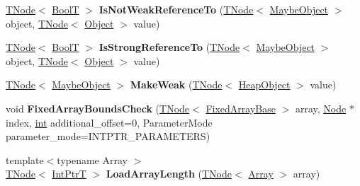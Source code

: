 \begin{DoxyCompactItemize}
\mbox{\hyperlink{classv8_1_1internal_1_1compiler_1_1TNode}{T\+Node}}$<$ \mbox{\hyperlink{structv8_1_1internal_1_1BoolT}{BoolT}} $>$ {\bfseries Is\+Not\+Weak\+Reference\+To} (\mbox{\hyperlink{classv8_1_1internal_1_1compiler_1_1TNode}{T\+Node}}$<$ \mbox{\hyperlink{classv8_1_1internal_1_1MaybeObject}{Maybe\+Object}} $>$ object, \mbox{\hyperlink{classv8_1_1internal_1_1compiler_1_1TNode}{T\+Node}}$<$ \mbox{\hyperlink{classv8_1_1internal_1_1Object}{Object}} $>$ value)
\item 
\mbox{\label{classv8_1_1internal_1_1CodeStubAssembler_a02ca556ddbd3b71af81a1e4bc521a5c2}} 
\mbox{\hyperlink{classv8_1_1internal_1_1compiler_1_1TNode}{T\+Node}}$<$ \mbox{\hyperlink{structv8_1_1internal_1_1BoolT}{BoolT}} $>$ {\bfseries Is\+Strong\+Reference\+To} (\mbox{\hyperlink{classv8_1_1internal_1_1compiler_1_1TNode}{T\+Node}}$<$ \mbox{\hyperlink{classv8_1_1internal_1_1MaybeObject}{Maybe\+Object}} $>$ object, \mbox{\hyperlink{classv8_1_1internal_1_1compiler_1_1TNode}{T\+Node}}$<$ \mbox{\hyperlink{classv8_1_1internal_1_1Object}{Object}} $>$ value)
\item 
\mbox{\label{classv8_1_1internal_1_1CodeStubAssembler_a1bad730c1cc70463a0a59e0b072755c3}} 
\mbox{\hyperlink{classv8_1_1internal_1_1compiler_1_1TNode}{T\+Node}}$<$ \mbox{\hyperlink{classv8_1_1internal_1_1MaybeObject}{Maybe\+Object}} $>$ {\bfseries Make\+Weak} (\mbox{\hyperlink{classv8_1_1internal_1_1compiler_1_1TNode}{T\+Node}}$<$ \mbox{\hyperlink{classv8_1_1internal_1_1HeapObject}{Heap\+Object}} $>$ value)
\item 
\mbox{\label{classv8_1_1internal_1_1CodeStubAssembler_a27d0543fc15a3a425c30a270a70b95e6}} 
void {\bfseries Fixed\+Array\+Bounds\+Check} (\mbox{\hyperlink{classv8_1_1internal_1_1compiler_1_1TNode}{T\+Node}}$<$ \mbox{\hyperlink{classv8_1_1internal_1_1FixedArrayBase}{Fixed\+Array\+Base}} $>$ array, \mbox{\hyperlink{classv8_1_1internal_1_1compiler_1_1Node}{Node}} $\ast$index, \mbox{\hyperlink{classint}{int}} additional\+\_\+offset=0, Parameter\+Mode parameter\+\_\+mode=I\+N\+T\+P\+T\+R\+\_\+\+P\+A\+R\+A\+M\+E\+T\+E\+RS)
\item 
\mbox{\label{classv8_1_1internal_1_1CodeStubAssembler_a718be241bea4313cba581ff0c6c22439}} 
{\footnotesize template$<$typename Array $>$ }\\\mbox{\hyperlink{classv8_1_1internal_1_1compiler_1_1TNode}{T\+Node}}$<$ \mbox{\hyperlink{structv8_1_1internal_1_1IntPtrT}{Int\+PtrT}} $>$ {\bfseries Load\+Array\+Length} (\mbox{\hyperlink{classv8_1_1internal_1_1compiler_1_1TNode}{T\+Node}}$<$ \mbox{\hyperlink{classv8_1_1Array}{Array}} $>$ array)

\end{DoxyCompactItemize}
